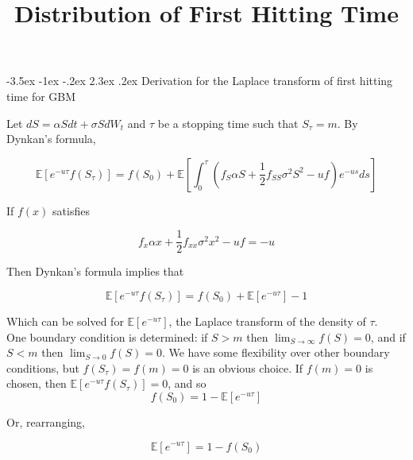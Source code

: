 \documentclass[12pt]{article}
\title{Distribution of First Hitting Time}
\makeatletter
\renewcommand\section{\@startsection{section}{1}{\z@}%
                                  {-3.5ex \@plus -1ex \@minus -.2ex}%
                                  {2.3ex \@plus.2ex}%
                                  {\normalfont\large\bfseries}}
\makeatother
\begin{document}

\setlength{\parindent}{0pt}












\maketitle
\section{Derivation for the Laplace transform of first hitting time for GBM}

Let \(dS=\alpha S dt+\sigma S dW_t\) and \(\tau\) be a stopping time such that \(S_\tau=m\).  By Dynkan's formula, 

\[\mathbb{E} [e^{-u\tau}f(S_\tau)]=f(S_0)+\mathbb{E}\left[ \int_0  ^ \tau \left(f_{S} \alpha S + \frac{1}{2} f_{SS} \sigma^2 S^2-uf\right) e^{-us} ds\right]\]

If \(f(x)\) satisfies 

\begin{equation}\label{ode}f_x \alpha x+\frac{1}{2} f_{xx} \sigma^2 x^2 -uf=-u\end{equation}

Then Dynkan's formula implies that 

\[\mathbb{E}[e^{-u\tau}f(S_\tau)]=f(S_0)+\mathbb{E}\left[e^{-u \tau}\right]-1\]

Which can be solved for \(\mathbb{E}\left[e^{-u \tau}\right]\), the Laplace transform of the density of \(\tau\).
\\

One boundary condition is determined: if \(S>m\) then \(\lim_{S \to \infty} f(S)=0\), and if \(S<m\) then \(\lim_{S \to 0} f(S)=0\).  We have some flexibility over other boundary conditions, but \(f(S_\tau)=f(m)=0\) is an obvious choice.  If \(f(m)=0\) is chosen, then \(\mathbb{E}[e^{-u\tau}f(S_\tau)]=0\), and so 
\[f(S_0)=1-\mathbb{E}\left[e^{-u \tau}\right]\]

Or, rearranging,

\begin{equation} \label{laplace} \mathbb{E}\left[e^{-u \tau}\right]=1-f(S_0)\end{equation}
\end{document}
